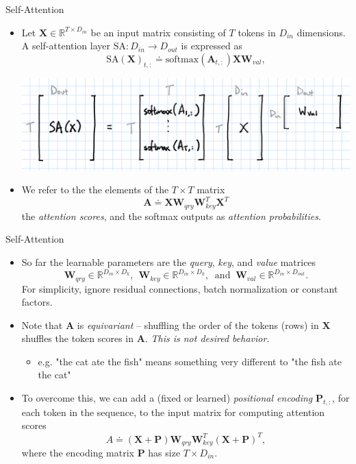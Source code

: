 \documentclass[9pt]{beamer}
\newcommand{\bb}{\mathbb}
\newcommand{\mb}{\bm}
\begin{document}
\begin{frame}{Self-Attention}
\begin{itemize}
\item Let $\bm X\in\bb R^{T\times D_{in}}$ be an input matrix consisting of $T$ tokens in $D_{in}$ dimensions. A self-attention layer $\mathrm{SA}:D_{in}\rightarrow D_{out}$ is expressed as
\begin{equation}
  \mathrm{SA}(\mb X)_{t,:} \doteq \mathrm{softmax}(\mb A_{t,:})\mb X\mb W_{val},
\end{equation}
\begin{center}
    \includegraphics[width=.7\textwidth]{images/softmax.PNG}
\end{center}
\vspace{.1in}

\item We refer to the the elements of the $T\times T$ matrix
\begin{equation}
\mb A \doteq \mb X \mb W_{qry}\mb W_{key}^T\mb X^T
\end{equation}
the {\em attention scores}, and the softmax outputs as {\em attention probabilities}.
\end{itemize}
\end{frame}


\begin{frame}{Self-Attention}
\begin{itemize}
\item So far the learnable parameters are the {\em query}, {\em key}, and {\em value} matrices
$$\mb W_{qry} \in \bb R^{D_{in}\times{D_k}}, \ \ 
\mb W_{key} \in \bb R^{D_{in}\times{D_k}},\ \text{ and } \ 
\mb W_{val} \in \bb R^{D_{in}\times{D_{out}}}.$$
For simplicity, ignore residual connections, batch normalization or constant factors.

\vspace{.1in}
\item Note that $\bm A$ is {\em equivariant} -- shuffling the order of the tokens (rows) in $\bm X$ shuffles the token scores in $\bm A$. {\em This is not desired behavior.}
\begin{itemize}
    \item e.g. "the cat ate the fish" means something very different to "the fish ate the cat"
\end{itemize}

\vspace{.1in}
\item To overcome this, we can add a (fixed or learned) {\em positional encoding} $\bm P_{t,:}$, for each token in the sequence, to the input matrix for computing attention scores
\begin{equation}
A \doteq (\mb X + \mb P)\mb W_{qry}\mb W_{key}^T (\mb X + \mb P)^T,
\end{equation}
where the encoding matrix $\bm P$ has size $T\times D_{in}$.
\end{itemize}
\end{frame}
\end{document}
